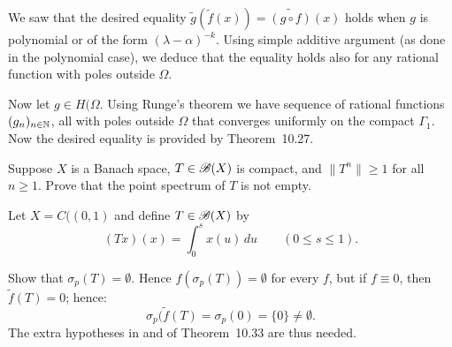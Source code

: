 \begin{enumerate}
\begin{itemize}
We saw that the desired equality
\(\widetilde{g}\left(\widetilde{f}(x)\right) = \widetilde{(g \circ f)}(x)\)
holds when $g$ is polynomial or of the form \((\lambda - \alpha)^{-k}\).
Using simple additive argument (as done in the polynomial case),
we deduce that the equality holds also for any rational function
with poles outside \(\Omega\).

Now let \(g\in H(\Omega\).
Using Runge's theorem we have sequence of rational functions \((g_n)_{n\in\mathbb{N}}\),
all with poles outside \(\Omega\) that converges uniformly
on the compact \(\Gamma_1\).
Now the desired equality is provided by Theorem~10.27.
\end{itemize}

\begin{excopy}
Suppose $X$ is a Banach space, \(T \in \mathscr{B}(X)\) is compact,
and \(\|T^n\| \geq 1\) for all \(n \geq 1\).
Prove that the point spectrum of $T$ is not empty.
\end{excopy}

\unfinished

\begin{excopy}
Let \(X = C((0, 1)\) and define \(T \in \mathscr{B}(X)\) by
\begin{equation*}
(Tx)(x) = \int_0^s x(u)\,du \qquad (0\leq s\leq 1).
\end{equation*}

Show that \(\sigma_p(T) = \emptyset\).
Hence \(f(\sigma_p(T)) = \emptyset\) for every $f$, but if \(f\equiv 0\),
then \(\widetilde{f}(T) = 0\); hence:
\begin{equation*}
\sigma_p(\widetilde{f}(T) = \sigma_p(0) = \{0\} \neq \emptyset.
\end{equation*}
The extra hypotheses in  and  of Theorem~10.33 are thus needed.
\end{excopy}
\unfinished

\begin{excopy}
\end{excopy}
\unfinished

\end{enumerate}
